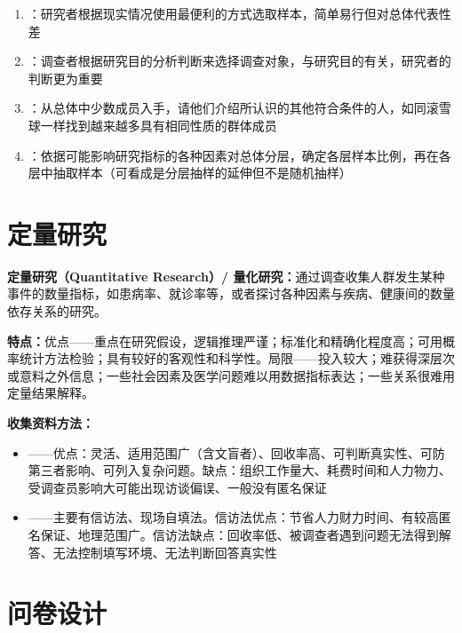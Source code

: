\begin{keybox}
\begin{enumerate}[leftmargin=*]
    \item {}：研究者根据现实情况使用最便利的方式选取样本，简单易行但对总体代表性差
    \item {}：调查者根据研究目的分析判断来选择调查对象，与研究目的有关，研究者的判断更为重要
    \item {}：从总体中少数成员入手，请他们介绍所认识的其他符合条件的人，如同滚雪球一样找到越来越多具有相同性质的群体成员
    \item {}：依据可能影响研究指标的各种因素对总体分层，确定各层样本比例，再在各层中抽取样本（可看成是分层抽样的延伸但不是随机抽样）
\end{enumerate}
\end{keybox}

\section{定量研究}

\begin{defbox}
\textbf{定量研究（Quantitative Research）/ 量化研究：}通过调查收集人群发生某种事件的数量指标，如患病率、就诊率等，或者探讨各种因素与疾病、健康间的数量依存关系的研究。

\textbf{特点：}优点——重点在研究假设，逻辑推理严谨；标准化和精确化程度高；可用概率统计方法检验；具有较好的客观性和科学性。局限——投入较大；难获得深层次或意料之外信息；一些社会因素及医学问题难以用数据指标表达；一些关系很难用定量结果解释。

\textbf{收集资料方法：}
\begin{itemize}[leftmargin=*]
    \item {}——优点：灵活、适用范围广（含文盲者）、回收率高、可判断真实性、可防第三者影响、可列入复杂问题。缺点：组织工作量大、耗费时间和人力物力、受调查员影响大可能出现访谈偏误、一般没有匿名保证
    \item {}——主要有信访法、现场自填法。信访法优点：节省人力财力时间、有较高匿名保证、地理范围广。信访法缺点：回收率低、被调查者遇到问题无法得到解答、无法控制填写环境、无法判断回答真实性
\end{itemize}
\end{defbox}

\section{问卷设计}

